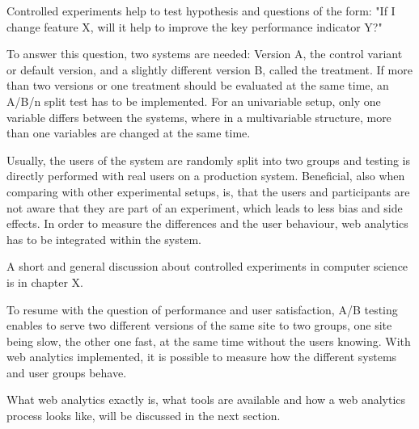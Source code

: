 Controlled experiments help to test hypothesis and questions of the form: "If I change feature X, will it help to improve the key performance indicator Y?"

To answer this question,  two systems are needed: Version A, the control variant or default version, and a slightly different version B, called the treatment.
If more than two versions or one treatment should be evaluated at the same time,  an A/B/n split test has to be implemented.
For an univariable setup, only one variable differs between the systems, where in a multivariable structure, more than one variables are changed at the same time.

Usually, the users of the system are randomly split into two groups and testing is directly performed with real users on a production system.
Beneficial, also when comparing with other experimental setups, is, that the users and participants are not aware that they are part of an experiment, which leads to less bias and side effects.
In order to measure the differences and the user behaviour, web analytics has to be integrated within the system.




A short and general discussion about controlled experiments in computer science is in chapter X. %



To resume with the question of performance and user satisfaction,  A/B testing enables to serve two different versions of the same site to two groups, one site being slow, the other one fast, at the same time without the users knowing.
With web analytics implemented, it is possible to measure how the different systems and user groups behave.

What web analytics exactly is, what tools are available and how a web analytics process looks like, will be discussed in the next section.








